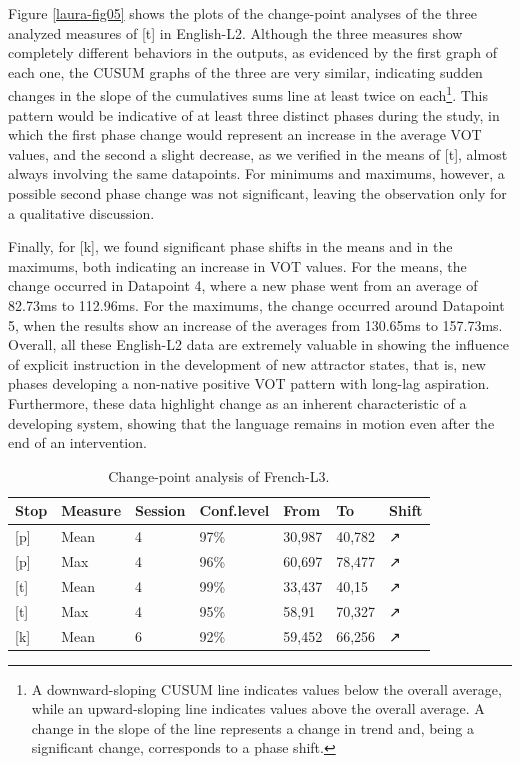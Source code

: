 Figure \ref{laura-fig05} shows the plots of the change-point analyses of the
three analyzed measures of [t] in English-L2. Although the three measures show
completely different behaviors in the outputs, as evidenced by the first graph
of each one, the CUSUM graphs of the three are very similar, indicating sudden
changes in the slope of the cumulatives sums line at least twice on
each\footnote{A downward-sloping CUSUM line indicates values below the overall
average, while an upward-sloping line indicates values above the overall
average. A change in the slope of the line represents a change in trend and,
being a significant change, corresponds to a phase shift.}. This
pattern would be indicative of at least three distinct phases during the study,
in which the first phase change would represent an increase in the average VOT
values, and the second a slight decrease, as we verified in the means of [t],
almost always involving the same datapoints. For minimums and maximums,
however, a possible second phase change was not significant, leaving the
observation only for a qualitative discussion. 

Finally, for [k], we found significant phase shifts in the means and in the
maximums, both indicating an increase in VOT values. For the means, the change
occurred in Datapoint 4, where a new phase went from an average of 82.73ms to
112.96ms. For the maximums, the change occurred around Datapoint 5, when the
results show an increase of the averages from 130.65ms to 157.73ms. Overall,
all these English-L2 data are extremely valuable in showing the influence of
explicit instruction in the development of new attractor states, that is, new
phases developing a non-native positive VOT pattern with long-lag aspiration.
Furthermore, these data highlight change as an inherent characteristic of a
developing system, showing that the language remains in motion even after the
end of an intervention. 

\begin{table}[h]
\caption{Change-point analysis of French-L3.}\label{laura-table03}
\begin{tabular}{@{}lllllll@{}}
\toprule
\textbf{Stop} & \textbf{Measure} & \textbf{Session} & \textbf{Conf.level} & \textbf{From} & \textbf{To} & \textbf{Shift} \\
\midrule 
{[}p{]} & Mean & 4 & 97\% & 30,987 & 40,782 & ↗ \\
{[}p{]} & Max & 4 & 96\% & 60,697 & 78,477 & ↗ \\
{[}t{]} & Mean & 4 & 99\% & 33,437 & 40,15 & ↗ \\
{[}t{]} & Max & 4 & 95\% & 58,91 & 70,327 & ↗ \\
{[}k{]} & Mean & 6 & 92\% & 59,452 & 66,256 & ↗ \\
\bottomrule
\end{tabular}
\end{table}

